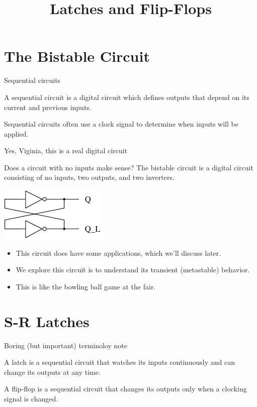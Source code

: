 \title{Latches and Flip-Flops}

\section{The Bistable Circuit}

\begin{frame}{Sequential circuits}
  \begin{definition}
    A \alert{sequential circuit} is a digital circuit which defines outputs that depend on its current and previous inputs.
  \end{definition}
  Sequential circuits often use a \alert{clock signal} to determine when inputs will be applied.
\end{frame}

\begin{frame}{Yes, Viginia, this is a real digital circuit}
  \begin{block}{Does a circuit with no inputs make sense?}
    The \alert{bistable} circuit is a digital circuit consisting of no inputs, two outputs, and two inverters.
  \end{block}
  \begin{center}
    \includegraphics{BistableCircuit}
  \end{center}
  \begin{itemize}
    \item This circuit does have some applications, which we'll discuss later.
    \item We explore this circuit is to understand its transient (\alert{metastable}) behavior.
    \item This is like the bowling ball game at the fair.
  \end{itemize}
\end{frame}

\section{S-R Latches}

\begin{frame}{Boring (but important) terminoloy note}
  \begin{definition}
    A \alert{latch} is a sequential circuit that watches its inputs continuously and can change its outputs at any time.
  \end{definition}
  \begin{definition}
    A \alert{flip-flop} is a sequential circuit that changes its outputs only when a clocking signal is changed.
  \end{definition}
\end{frame}

